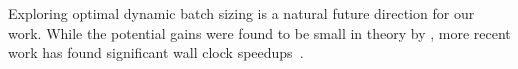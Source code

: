 Exploring optimal dynamic batch sizing is a natural future direction
for our work.  While the potential gains were found to be small in
theory by \citet{mccandlish2018empirical}, more recent work has found
significant wall clock speedups~\citep{meterez2025seesaw}.
%

%
%
